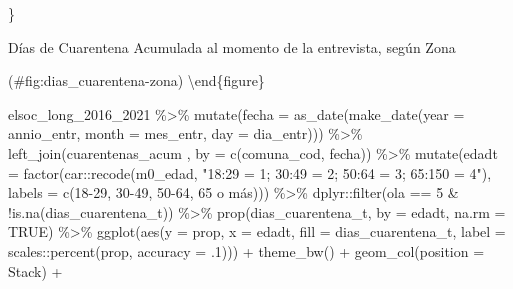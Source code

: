 \documentclass[
  12pt,
]{book}
\newenvironment{Shaded}{\begin{snugshade}}{\end{snugshade}}
\newcommand{\AttributeTok}[1]{\textcolor[rgb]{0.77,0.63,0.00}{#1}}
\newcommand{\ConstantTok}[1]{\textcolor[rgb]{0.00,0.00,0.00}{#1}}
\newcommand{\DecValTok}[1]{\textcolor[rgb]{0.00,0.00,0.81}{#1}}
\newcommand{\FunctionTok}[1]{\textcolor[rgb]{0.00,0.00,0.00}{#1}}
\newcommand{\NormalTok}[1]{#1}
\newcommand{\SpecialCharTok}[1]{\textcolor[rgb]{0.00,0.00,0.00}{#1}}
\newcommand{\StringTok}[1]{\textcolor[rgb]{0.31,0.60,0.02}{#1}}
\begin{document}
\}

\caption{Días de Cuarentena Acumulada al momento de la entrevista, según Zona}

(\#fig:dias\_cuarentena-zona)
\textbackslash end\{figure\}

\begin{Shaded}
\begin{Highlighting}[]
\NormalTok{elsoc\_long\_2016\_2021 }\SpecialCharTok{\%\textgreater{}\%} 
  \FunctionTok{mutate}\NormalTok{(}\AttributeTok{fecha =} \FunctionTok{as\_date}\NormalTok{(}\FunctionTok{make\_date}\NormalTok{(}\AttributeTok{year =}\NormalTok{ annio\_entr, }\AttributeTok{month =}\NormalTok{ mes\_entr, }\AttributeTok{day =}\NormalTok{ dia\_entr))) }\SpecialCharTok{\%\textgreater{}\%} 
  \FunctionTok{left\_join}\NormalTok{(cuarentenas\_acum , }\AttributeTok{by =} \FunctionTok{c}\NormalTok{(}\StringTok{\textquotesingle{}comuna\_cod\textquotesingle{}}\NormalTok{, }\StringTok{\textquotesingle{}fecha\textquotesingle{}}\NormalTok{)) }\SpecialCharTok{\%\textgreater{}\%} 
  \FunctionTok{mutate}\NormalTok{(}\AttributeTok{edadt =} \FunctionTok{factor}\NormalTok{(car}\SpecialCharTok{::}\FunctionTok{recode}\NormalTok{(m0\_edad, }\StringTok{"18:29 = 1; 30:49 = 2; 50:64 = 3; 65:150 = 4"}\NormalTok{),}
                           \AttributeTok{labels =} \FunctionTok{c}\NormalTok{(}\StringTok{\textquotesingle{}18{-}29\textquotesingle{}}\NormalTok{, }\StringTok{\textquotesingle{}30{-}49\textquotesingle{}}\NormalTok{, }\StringTok{\textquotesingle{}50{-}64\textquotesingle{}}\NormalTok{, }\StringTok{\textquotesingle{}65 o más\textquotesingle{}}\NormalTok{))) }\SpecialCharTok{\%\textgreater{}\%}
\NormalTok{  dplyr}\SpecialCharTok{::}\FunctionTok{filter}\NormalTok{(ola }\SpecialCharTok{==} \DecValTok{5} \SpecialCharTok{\&} \SpecialCharTok{!}\FunctionTok{is.na}\NormalTok{(dias\_cuarentena\_t)) }\SpecialCharTok{\%\textgreater{}\%} 
  \FunctionTok{prop}\NormalTok{(dias\_cuarentena\_t, }\AttributeTok{by =}\NormalTok{ edadt, }\AttributeTok{na.rm =} \ConstantTok{TRUE}\NormalTok{) }\SpecialCharTok{\%\textgreater{}\%}
  \FunctionTok{ggplot}\NormalTok{(}\FunctionTok{aes}\NormalTok{(}\AttributeTok{y =}\NormalTok{ prop, }\AttributeTok{x =}\NormalTok{ edadt, }\AttributeTok{fill =}\NormalTok{ dias\_cuarentena\_t, }
             \AttributeTok{label =}\NormalTok{ scales}\SpecialCharTok{::}\FunctionTok{percent}\NormalTok{(prop, }\AttributeTok{accuracy =}\NormalTok{ .}\DecValTok{1}\NormalTok{))) }\SpecialCharTok{+} 
  \FunctionTok{theme\_bw}\NormalTok{() }\SpecialCharTok{+} 
  \FunctionTok{geom\_col}\NormalTok{(}\AttributeTok{position =} \StringTok{\textquotesingle{}Stack\textquotesingle{}}\NormalTok{) }\SpecialCharTok{+}

\end{Highlighting}
\end{Shaded}
\end{document}
